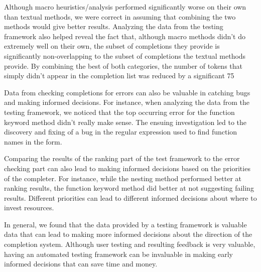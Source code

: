 \documentclass[ms,electronic,twosidetoc,letterpaper,chaptercenter,parttop,lol,lof,lot]{byumsphd}
\begin{document}
Although macro heuristics/analysis performed significantly worse on their own than textual
methods, we were correct in assuming that combining the two methods would give better
results. Analyzing the data from the testing framework also helped reveal the fact that,
although macro methods didn't do extremely well on their own, the subset of completions
they provide is significantly non-overlapping to the subset of completions the textual
methods provide. By combining the best of both categories, the number of tokens that
simply didn't appear in the completion list was reduced by a significant 75%

Data from checking completions for errors can also be valuable in catching bugs and making
informed decisions. For instance, when analyzing the data from the testing framework, we
noticed that the top occurring error for the function keyword method didn't really make
sense. The ensuing investigation led to the discovery and fixing of a bug in the regular
expression used to find function names in the  form.

Comparing the results of the ranking part of the test framework to the error checking part
can also lead to making informed decisions based on the priorities of the completer. For
instance, while the nesting method performed better at ranking results, the function
keyword method did better at not suggesting failing results. Different priorities can lead
to different informed decisions about where to invest resources.

In general, we found that the data provided by a testing framework is valuable data that
can lead to making more informed decisions about the direction of the completion system.
Although user testing and resulting feedback is very valuable, having an automated testing
framework can be invaluable in making early informed decisions that can save time and
money.



\end{document}
